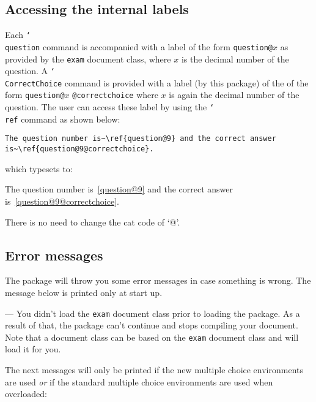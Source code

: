 \documentclass[12pt,a4paper]{exam}
\providecommand{\texorpdfstring}[2]{#1}
\newcommand{\bs}{\texorpdfstring{\char`\\}{}}
\begin{document}
\subsection{Accessing the internal labels}
Each \texttt{\bs question} command is accompanied with a label of the form
\texttt{question@}$x$ as provided by the \texttt{exam} document class, where
$x$ is the decimal number of the question. A \texttt{\bs CorrectChoice}
command is provided with a label (by this package) of the of the form \texttt{question@}$x$%
\texttt{@correctchoice} where $x$ is again the decimal number of the question.
The user can access these label by using the \texttt{\bs ref} command as shown
below:

\begin{lstlisting}
The question number is~\ref{question@9} and the correct answer
is~\ref{question@9@correctchoice}.
\end{lstlisting}

which typesets to:

The question number is~\ref{question@9} and the correct answer
is~\ref{question@9@correctchoice}.

There is no need to change the cat code of `@'.

\subsection{Error messages}
The package will throw you some error messages in case something is wrong. The
message below is printed only at start up.

\begin{description}[labelindent=2ex]
\item[\texttt{The exam class is not loaded. Emergency stop!}] --- You didn't load
the \texttt{exam} document class prior to loading the package. As a result of that,
the package can't continue and stops compiling your document. Note that a document
class can be based on the \texttt{exam} document class and will load it for you.

\end{description}

The next messages will only be printed if the new multiple choice environments
are used \emph{or} if the standard multiple choice environments are used when
overloaded: 
\end{document}
